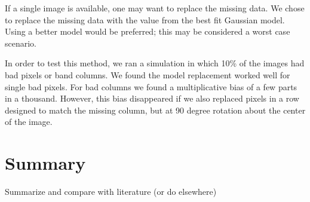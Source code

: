 \documentclass[a4paper,fleqn,usenatbib]{mnras}
\newcommand{\mcalR}{$R$}
\begin{document}
If a single image is available, one may want to replace the missing data.  We
chose to replace the missing data with the value from the best fit Gaussian
model.  Using a better model would be preferred; this may be considered a worst
case scenario.

In order to test this method, we ran a simulation in which 10\% of the images
had bad pixels or band columns. We found the model replacement worked well for
single bad pixels. For bad columns we found a multiplicative bias of a few
parts in a thousand. However, this bias disappeared if we also replaced pixels
in a row designed to match the missing column, but at 90 degree rotation about
the center of the image.

\section{Summary}

Summarize and compare with literature (or do elsewhere)

\end{document}

